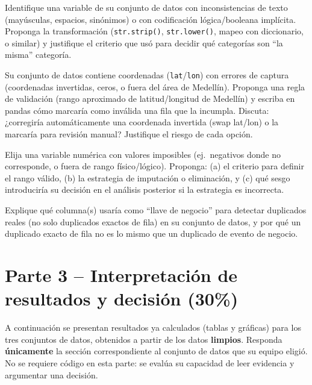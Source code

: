 \documentclass[11pt]{article}
\begin{document}
\begin{pregunta}
Identifique una variable de su conjunto de datos con inconsistencias de texto (mayúsculas, espacios, sinónimos) o con codificación lógica/booleana implícita. Proponga la transformación (\texttt{str.strip()}, \texttt{str.lower()}, mapeo con diccionario, o similar) y justifique el criterio que usó para decidir qué categorías son ``la misma'' categoría.
\end{pregunta}

\begin{pregunta}
Su conjunto de datos contiene coordenadas (\texttt{lat}/\texttt{lon}) con errores de captura (coordenadas invertidas, ceros, o fuera del área de Medellín). Proponga una regla de validación (rango aproximado de latitud/longitud de Medellín) y escriba en pandas cómo marcaría como inválida una fila que la incumpla. Discuta: ¿corregiría automáticamente una coordenada invertida (swap lat/lon) o la marcaría para revisión manual? Justifique el riesgo de cada opción.
\end{pregunta}

\begin{pregunta}
Elija una variable numérica con valores imposibles (ej.\ negativos donde no corresponde, o fuera de rango físico/lógico). Proponga: (a) el criterio para definir el rango válido, (b) la estrategia de imputación o eliminación, y (c) qué sesgo introduciría su decisión en el análisis posterior si la estrategia es incorrecta.
\end{pregunta}

\begin{pregunta}
Explique qué columna(s) usaría como ``llave de negocio'' para detectar duplicados reales (no solo duplicados exactos de fila) en su conjunto de datos, y por qué un duplicado exacto de fila no es lo mismo que un duplicado de evento de negocio.
\end{pregunta}

\section{Parte 3 -- Interpretación de resultados y decisión (30\%)}
\begin{contexto}
A continuación se presentan resultados ya calculados (tablas y gráficas) para los tres conjuntos de datos, obtenidos a partir de los datos \textbf{limpios}. Responda \textbf{únicamente} la sección correspondiente al conjunto de datos que su equipo eligió. No se requiere código en esta parte: se evalúa su capacidad de leer evidencia y argumentar una decisión.
\end{contexto}
\end{document}
